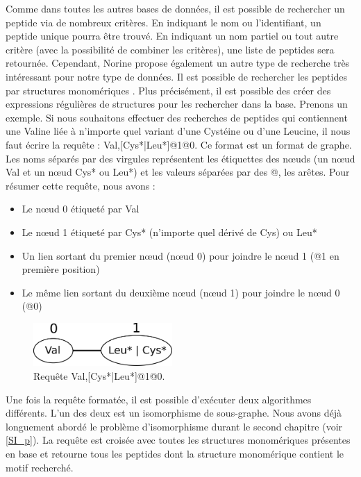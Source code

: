 Comme dans toutes les autres bases de données, il est possible de rechercher un peptide via de nombreux critères.
En indiquant le nom ou l'identifiant, un peptide unique pourra être trouvé.
En indiquant un nom partiel ou tout autre critère (avec la possibilité de combiner les critères), une liste de peptides sera retournée.
Cependant, Norine propose également un autre type de recherche très intéressant pour notre type de données.
Il est possible de rechercher les peptides par structures monomériques \cite{caboche_structural_2009}.
Plus précisément, il est possible des créer des expressions régulières de structures pour les rechercher dans la base.
Prenons un exemple.
Si nous souhaitons effectuer des recherches de peptides qui contiennent une Valine liée à n'importe quel variant d'une Cystéine ou d'une Leucine, il nous faut écrire la requête : Val,[Cys*|Leu*]@1@0.
Ce format est un format de graphe.
Les noms séparés par des virgules représentent les étiquettes des n\oe{}uds (un n\oe{}ud Val et un n\oe{}ud Cys* ou Leu*) et les valeurs séparées par des @, les arêtes.
Pour résumer cette requête, nous avons :
\begin{itemize}
 \item Le n\oe{}ud 0 étiqueté par Val
 \item Le n\oe{}ud 1 étiqueté par Cys* (n'importe quel dérivé de Cys) ou Leu*
 \item Un lien sortant du premier n\oe{}ud (n\oe{}ud 0) pour joindre le n\oe{}ud 1 (@1 en première position)
 \item Le même lien sortant du deuxième n\oe{}ud (n\oe{}ud 1) pour joindre le n\oe{}ud 0 (@0)
\end{itemize}

\begin{figure}[h!]
  \begin{center}
    \includegraphics[width=200px]{Figures/Norine/requete.png}
    \caption{\label{requete}Requête Val,[Cys*|Leu*]@1@0.}
  \end{center}
\end{figure}

Une fois la requête formatée, il est possible d'exécuter deux algorithmes différents.
L'un des deux est un isomorphisme de sous-graphe.
Nous avons déjà longuement abordé le problème d'isomorphisme durant le second chapitre (voir \ref{SI_p}).
La requête est croisée avec toutes les structures monomériques présentes en base et retourne tous les peptides dont la structure monomérique contient le motif recherché.

